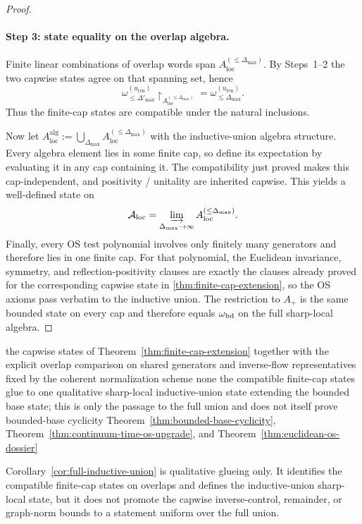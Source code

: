 \begin{proof}
\paragraph*{Step 3: state equality on the overlap algebra.}
Finite linear combinations of overlap words span $A_{\mathrm{loc}}^{(\le \Delta_{\max})}$. By Steps~1--2 the two capwise states agree on that spanning set, hence
\[
\omega_{\le \Delta'_{\max}}^{(u_{\mathrm{ren}})}\!\upharpoonright_{A_{\mathrm{loc}}^{(\le \Delta_{\max})}}=\omega_{\le \Delta_{\max}}^{(u_{\mathrm{ren}})}.
\]
Thus the finite-cap states are compatible under the natural inclusions.

Now let $A_{\mathrm{loc}}^{\mathrm{alg}}:=\bigcup_{\Delta_{\max}}A_{\mathrm{loc}}^{(\le \Delta_{\max})}$ with the inductive-union algebra structure. Every algebra element lies in some finite cap, so define its expectation by evaluating it in any cap containing it. The compatibility just proved makes this cap-independent, and positivity / unitality are inherited capwise. This yields a well-defined state on
\[
\mathcal{A}_{\mathrm{loc}}=\varinjlim_{\Delta_{\max}\to\infty} A_{\mathrm{loc}}^{(\le \Delta_{\max})}.
\]
Finally, every OS test polynomial involves only finitely many generators and therefore lies in one finite cap. For that polynomial, the Euclidean invariance, symmetry, and reflection-positivity clauses are exactly the clauses already proved for the corresponding capwise state in \cref{thm:finite-cap-extension}, so the OS axioms pass verbatim to the inductive union. The restriction to $A_+$ is the same bounded state on every cap and therefore equals $\omega_{\mathrm{bd}}$ on the full sharp-local algebra.
\end{proof}

\dependencyledger
  {the capwise states of Theorem~\ref{thm:finite-cap-extension} together with the explicit overlap comparison on shared generators and inverse-flow representatives fixed by the coherent normalization scheme}
  {none}
  {the compatible finite-cap states glue to one qualitative sharp-local inductive-union state extending the bounded base state; this is only the passage to the full union and does not itself prove bounded-base cyclicity}
  {Theorem~\ref{thm:bounded-base-cyclicity}, Theorem~\ref{thm:continuum-time-os-upgrade}, and Theorem~\ref{thm:euclidean-os-dossier}}
\begin{remark}
Corollary~\ref{cor:full-inductive-union} is qualitative glueing only. It identifies the compatible finite-cap states on overlaps and defines the inductive-union sharp-local state, but it does not promote the capwise inverse-control, remainder, or graph-norm bounds to a statement uniform over the full union.
\end{remark}


